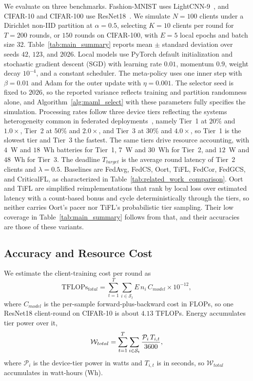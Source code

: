 \documentclass[journal]{IEEEtran}
\theoremstyle{remark}
\newcommand{\revision}[1]{#1}
\newcommand{\revtwo}[1]{#1}
\begin{document}
\revision{We evaluate on three benchmarks. Fashion-MNIST uses LightCNN-9~\cite{wu2018light}, and CIFAR-10 and CIFAR-100 use ResNet18~\cite{he2016deep}.} \revision{We simulate $N = 100$ clients under a Dirichlet non-IID partition at $\alpha = 0.5$, selecting $K = 10$ clients per round for $T = 200$ rounds, or $150$ rounds on CIFAR-100, with $E = 5$ local epochs and batch size 32. Table~\ref{tab:main_summary} reports mean $\pm$ standard deviation over seeds $42$, $123$, and $2026$. Local models use PyTorch default initialization and stochastic gradient descent (SGD) with learning rate $0.01$, momentum $0.9$, weight decay $10^{-4}$, and a constant scheduler. The meta-policy uses one inner step with $\beta=0.01$ and Adam for the outer update with $\eta=0.001$. The selector seed is fixed to $2026$, so the reported variance reflects training and partition randomness alone, and Algorithm~\ref{alg:maml_select} with these parameters fully specifies the simulation. Processing rates follow three device tiers reflecting the systems heterogeneity common in federated deployments~\cite{li2020federated}, namely Tier~1 at $20\%$ and $1.0\times$, Tier~2 at $50\%$ and $2.0\times$, and Tier~3 at $30\%$ and $4.0\times$, so Tier~1 is the slowest tier and Tier~3 the fastest. The same tiers drive resource accounting, with $4$~W and $18$~Wh batteries for Tier~1, $7$~W and $30$~Wh for Tier~2, and $12$~W and $48$~Wh for Tier~3.} {\color{black}The deadline $T_{target}$ is the average round latency of Tier~2 clients and $\lambda = 0.5$. \revision{Baselines are FedAvg, FedCS, Oort, TiFL, FedCor, FedGCS, and CriticalFL, as characterized in Table~\ref{tab:related_work_comparison}.} \revtwo{Oort and TiFL are simplified reimplementations that rank by local loss over estimated latency with a count-based bonus and cycle deterministically through the tiers, so neither carries Oort's pacer nor TiFL's probabilistic tier sampling. Their low coverage in Table~\ref{tab:main_summary} follows from that, and their accuracies are those of these variants.}}

\subsection{\revision{Accuracy and Resource Cost}}\label{sec:results_acc}
\revision{We estimate the client-training cost per round as}
\begin{equation}
	\text{TFLOPs}_{total} = \sum_{t=1}^{T} \sum_{i \in \mathcal{S}_t} E\, n_i\, C_{model} \times 10^{-12},
	\label{eq:tflops}
\end{equation}
\revision{where $C_{model}$ is the per-sample forward-plus-backward cost in FLOPs, so one ResNet18 client-round on CIFAR-10 is about $4.13$ TFLOPs.} \revtwo{Energy accumulates tier power over it,}
\begin{equation}
\color{black}
\mathcal{W}_{total}=\sum_{t=1}^{T}\sum_{i\in\mathcal{S}_t} \frac{\mathcal{P}_i\,T_{i,t}}{3600},
\label{eq:energy}
\end{equation}
\revision{where $\mathcal{P}_i$ is the device-tier power in watts and $T_{i,t}$ is in seconds, so $\mathcal{W}_{total}$ accumulates in watt-hours (Wh).}
\end{document}
